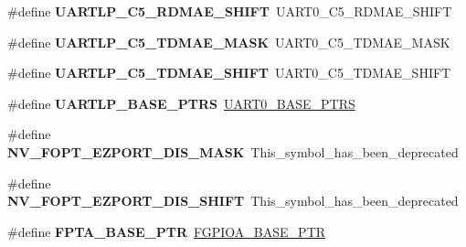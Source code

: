 \begin{DoxyCompactItemize}
\#define {\bfseries U\+A\+R\+T\+L\+P\+\_\+\+C5\+\_\+\+R\+D\+M\+A\+E\+\_\+\+S\+H\+I\+FT}~U\+A\+R\+T0\+\_\+\+C5\+\_\+\+R\+D\+M\+A\+E\+\_\+\+S\+H\+I\+FT
\item 
\mbox{\label{group___backward___compatibility___symbols_ga7846766b042194a47ed511aa4114210e}} 
\#define {\bfseries U\+A\+R\+T\+L\+P\+\_\+\+C5\+\_\+\+T\+D\+M\+A\+E\+\_\+\+M\+A\+SK}~U\+A\+R\+T0\+\_\+\+C5\+\_\+\+T\+D\+M\+A\+E\+\_\+\+M\+A\+SK
\item 
\mbox{\label{group___backward___compatibility___symbols_gac2909b753be3968e0878180017501e56}} 
\#define {\bfseries U\+A\+R\+T\+L\+P\+\_\+\+C5\+\_\+\+T\+D\+M\+A\+E\+\_\+\+S\+H\+I\+FT}~U\+A\+R\+T0\+\_\+\+C5\+\_\+\+T\+D\+M\+A\+E\+\_\+\+S\+H\+I\+FT
\item 
\mbox{\label{group___backward___compatibility___symbols_ga1913c55fe9312bdb0414edc7553329f3}} 
\#define {\bfseries U\+A\+R\+T\+L\+P\+\_\+\+B\+A\+S\+E\+\_\+\+P\+T\+RS}~\hyperlink{group___u_a_r_t0___peripheral_ga9416d89d2bc04eb37311da5910f1c701}{U\+A\+R\+T0\+\_\+\+B\+A\+S\+E\+\_\+\+P\+T\+RS}
\item 
\mbox{\label{group___backward___compatibility___symbols_ga5c130a6f11de9f04a77b36fd61843e8f}} 
\#define {\bfseries N\+V\+\_\+\+F\+O\+P\+T\+\_\+\+E\+Z\+P\+O\+R\+T\+\_\+\+D\+I\+S\+\_\+\+M\+A\+SK}~This\+\_\+symbol\+\_\+has\+\_\+been\+\_\+deprecated
\item 
\mbox{\label{group___backward___compatibility___symbols_gabf1111ccacc4104b2855c4f3851cbaa5}} 
\#define {\bfseries N\+V\+\_\+\+F\+O\+P\+T\+\_\+\+E\+Z\+P\+O\+R\+T\+\_\+\+D\+I\+S\+\_\+\+S\+H\+I\+FT}~This\+\_\+symbol\+\_\+has\+\_\+been\+\_\+deprecated
\item 
\mbox{\label{group___backward___compatibility___symbols_ga4b0d89f517528ab7c1d2fdefe4c863d8}} 
\#define {\bfseries F\+P\+T\+A\+\_\+\+B\+A\+S\+E\+\_\+\+P\+TR}~\hyperlink{group___f_g_p_i_o___peripheral_gab3a191da68ebf432fd4f94966600d287}{F\+G\+P\+I\+O\+A\+\_\+\+B\+A\+S\+E\+\_\+\+P\+TR}
\item 
\mbox{\label{group___backward___compatibility___symbols_ga725ec21a43213bffe0aa484f7406bcf5}} 

\end{DoxyCompactItemize}
